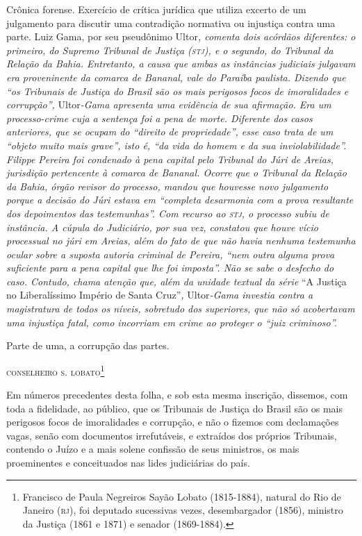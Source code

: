 \begin{didascalia}
Crônica forense. Exercício de crítica jurídica que utiliza excerto de um
julgamento para discutir uma contradição normativa ou injustiça contra
uma parte. Luiz Gama, por seu pseudônimo Ultor\emph{, comenta dois
acórdãos diferentes: o primeiro, do Supremo Tribunal de Justiça (\textsc{stj}), e
o segundo, do Tribunal da Relação da Bahia. Entretanto, a causa que
ambas as instâncias judiciais julgavam era proveninente da comarca de
Bananal, vale do Paraíba paulista. Dizendo que ``os Tribunais de Justiça
do Brasil são os mais perigosos focos de imoralidades e corrupção'',}
Ultor\emph{-Gama apresenta uma evidência de sua afirmação. Era um
processo-crime cuja a sentença foi a pena de morte. Diferente dos casos
anteriores, que se ocupam do ``direito de propriedade'', esse caso trata
de um ``objeto muito mais grave'', isto é, ``da vida do homem e da sua
inviolabilidade''. Filippe Pereira foi condenado à pena capital pelo
Tribunal do Júri de Areias, jurisdição pertencente à comarca de Bananal.
Ocorre que o Tribunal da Relação da Bahia, órgão revisor do processo,
mandou que houvesse novo julgamento porque a decisão do Júri estava em
``completa desarmonia com a prova resultante dos depoimentos das
testemunhas''. Com recurso ao \textsc{stj}, o processo subiu de instância. A
cúpula do Judiciário, por sua vez, constatou que houve vício processual
no júri em Areias, além do fato de que não havia nenhuma testemunha
ocular sobre a suposta autoria criminal de Pereira, ``nem outra alguma
prova suficiente para a pena capital que lhe foi imposta''. Não se sabe o
desfecho do caso. Contudo, chama atenção que, além da unidade textual da
série} ``A Justiça no Liberalíssimo Império de Santa Cruz''\emph{,}
Ultor\emph{-Gama investia contra a magistratura de todos os níveis,
sobretudo dos superiores, que não só acobertavam uma injustiça fatal,
como incorriam em crime ao proteger o ``juiz criminoso''.}
\end{didascalia}



Parte de uma, a corrupção das partes.

\textsc{conselheiro s. lobato}\footnote{Francisco de Paula Negreiros Sayão
  Lobato (1815-1884), natural do Rio de Janeiro (\textsc{rj}), foi deputado
  sucessivas vezes, desembargador (1856), ministro da Justiça (1861 e
  1871) e senador (1869-1884).}

Em números precedentes desta folha, e sob esta mesma inscrição,
dissemos, com toda a fidelidade, ao público, que os Tribunais de Justiça
do Brasil são os mais perigosos focos de imoralidades e corrupção, e não
o fizemos com declamações vagas, senão com documentos irrefutáveis, e
extraídos dos próprios Tribunais, contendo o Juízo e a mais solene
confissão de seus ministros, os mais proeminentes e conceituados nas
lides judiciárias do país.

